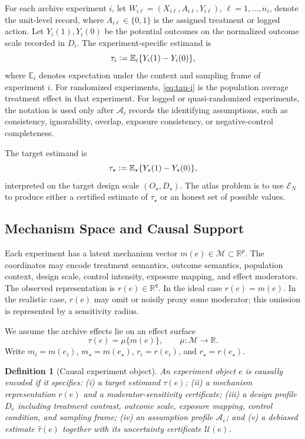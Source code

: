 \documentclass[11pt]{article}
\numberwithin{equation}{section}
\newtheorem{definition}{Definition}[section]
\newcommand{\E}{\mathbb E}
\newcommand{\R}{\mathbb R}
\newcommand{\1}{\mathbf 1}
\newcommand{\cA}{\mathcal A}
\newcommand{\cE}{\mathcal E}
\newcommand{\cM}{\mathcal M}
\newcommand{\cU}{\mathcal U}
\newcommand{\defeq}{\vcentcolon=}
\begin{document}
For each archive experiment \(i\), let \(W_{i\ell}=(X_{i\ell},A_{i\ell},Y_{i\ell})\), \(\ell=1,\ldots,n_i\), denote the unit-level record, where \(A_{i\ell}\in\{0,1\}\) is the assigned treatment or logged action.  Let \(Y_i(1),Y_i(0)\) be the potential outcomes on the normalized outcome scale recorded in \(D_i\).  The experiment-specific estimand is
\begin{equation}
\label{eq:tau-i}
  \tau_i
  \defeq
  \E_i\{Y_i(1)-Y_i(0)\},
\end{equation}
where \(\E_i\) denotes expectation under the context and sampling frame of experiment \(i\).  For randomized experiments, \eqref{eq:tau-i} is the population average treatment effect in that experiment.  For logged or quasi-randomized experiments, the notation is used only after \(\cA_i\) records the identifying assumptions, such as consistency, ignorability, overlap, exposure consistency, or negative-control completeness.

The target estimand is
\begin{equation}
\label{eq:target-tau}
  \tau_\star
  \defeq
  \E_\star\{Y_\star(1)-Y_\star(0)\},
\end{equation}
interpreted on the target design scale \((O_\star,D_\star)\).  The atlas problem is to use \(\cE_N\) to produce either a certified estimate of \(\tau_\star\) or an honest set of possible values.

\subsection{Mechanism Space and Causal Support}

Each experiment has a latent mechanism vector \(m(e)\in\cM\subset\R^p\).  The coordinates may encode treatment semantics, outcome semantics, population context, design scale, control intensity, exposure mapping, and effect moderators.  The observed representation is \(r(e)\in\R^q\).  In the ideal case \(r(e)=m(e)\).  In the realistic case, \(r(e)\) may omit or noisily proxy some moderator; this omission is represented by a sensitivity radius.

We assume the archive effects lie on an effect surface
\begin{equation}
\label{eq:effect-surface}
  \tau(e)=\mu\{m(e)\},\qquad \mu:\cM\to\R.
\end{equation}
Write \(m_i=m(e_i)\), \(m_\star=m(e_\star)\), \(r_i=r(e_i)\), and \(r_\star=r(e_\star)\).

\begin{definition}[Causal experiment object]
An experiment object \(e\) is \emph{causally encoded} if it specifies: (i) a target estimand \(\tau(e)\); (ii) a mechanism representation \(r(e)\) and a moderator-sensitivity certificate; (iii) a design profile \(D_e\) including treatment contrast, outcome scale, exposure mapping, control condition, and sampling frame; (iv) an assumption profile \(\cA_e\); and (v) a debiased estimate \(\widehat\tau(e)\) together with its uncertainty certificate \(\cU(e)\).
\end{definition}
\end{document}
